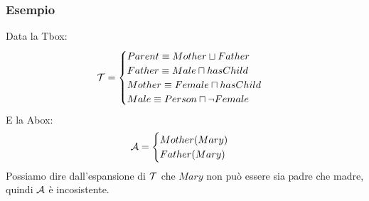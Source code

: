 \documentclass[../main.tex]{subfiles}
\begin{document}
   \subsubsection{Esempio}
   Data la Tbox:
   \begin{equation*}
      \mathcal{T}=
      \begin{cases}
         Parent \equiv Mother \sqcup Father\\
         Father \equiv Male \sqcap hasChild\\
         Mother \equiv Female \sqcap hasChild\\
         Male \equiv Person \sqcap \lnot Female
      \end{cases}
   \end{equation*}
   E la Abox:
   \begin{equation*}
      \mathcal{A}=
      \begin{cases}
         Mother(Mary)\\
         Father(Mary)
      \end{cases}
   \end{equation*}
   Possiamo dire dall'espansione di $\mathcal{T}$ che $Mary$ non può essere sia padre che madre, quindi $\mathcal{A}$ è incosistente.
   \spazio
   
\end{document}

